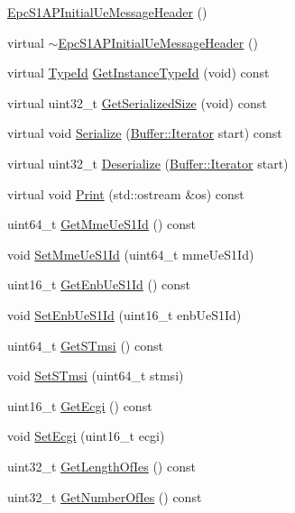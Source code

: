 \begin{DoxyCompactItemize}
\item 
\hyperlink{classns3_1_1EpcS1APInitialUeMessageHeader_a244c755dc91ef9eaf71f06ce5fc20488}{Epc\+S1\+A\+P\+Initial\+Ue\+Message\+Header} ()
\item 
virtual \hyperlink{classns3_1_1EpcS1APInitialUeMessageHeader_a51ef200815802b7791910334de72fe09}{$\sim$\+Epc\+S1\+A\+P\+Initial\+Ue\+Message\+Header} ()
\item 
virtual \hyperlink{classns3_1_1TypeId}{Type\+Id} \hyperlink{classns3_1_1EpcS1APInitialUeMessageHeader_aa44f600a010413f2c0294f8eaf073b9e}{Get\+Instance\+Type\+Id} (void) const 
\item 
virtual uint32\+\_\+t \hyperlink{classns3_1_1EpcS1APInitialUeMessageHeader_a1d8a75614f79dc481dbba20c54079d6b}{Get\+Serialized\+Size} (void) const 
\item 
virtual void \hyperlink{classns3_1_1EpcS1APInitialUeMessageHeader_a3025b6b39964b1ccf6a50fb8ccc308de}{Serialize} (\hyperlink{classns3_1_1Buffer_1_1Iterator}{Buffer\+::\+Iterator} start) const 
\item 
virtual uint32\+\_\+t \hyperlink{classns3_1_1EpcS1APInitialUeMessageHeader_a74d198c4856c95609d20484363e75591}{Deserialize} (\hyperlink{classns3_1_1Buffer_1_1Iterator}{Buffer\+::\+Iterator} start)
\item 
virtual void \hyperlink{classns3_1_1EpcS1APInitialUeMessageHeader_a17dd1cbb77c11db6abc9fcb5e1bcf787}{Print} (std\+::ostream \&os) const 
\item 
uint64\+\_\+t \hyperlink{classns3_1_1EpcS1APInitialUeMessageHeader_a5945bfe1328526ac23087a36c5cfe100}{Get\+Mme\+Ue\+S1\+Id} () const 
\item 
void \hyperlink{classns3_1_1EpcS1APInitialUeMessageHeader_ac2e51e3ced3a394746bb2fc943ca512c}{Set\+Mme\+Ue\+S1\+Id} (uint64\+\_\+t mme\+Ue\+S1\+Id)
\item 
uint16\+\_\+t \hyperlink{classns3_1_1EpcS1APInitialUeMessageHeader_a59a25c80e98c57d14e79c7dc18ad5202}{Get\+Enb\+Ue\+S1\+Id} () const 
\item 
void \hyperlink{classns3_1_1EpcS1APInitialUeMessageHeader_a62deca35d6e6e9ac140f021bf27e307e}{Set\+Enb\+Ue\+S1\+Id} (uint16\+\_\+t enb\+Ue\+S1\+Id)
\item 
uint64\+\_\+t \hyperlink{classns3_1_1EpcS1APInitialUeMessageHeader_a82ec89a18b606765015d88a8df903d23}{Get\+S\+Tmsi} () const 
\item 
void \hyperlink{classns3_1_1EpcS1APInitialUeMessageHeader_aba141b5f39e55d9faa8f612ea9a4a7b6}{Set\+S\+Tmsi} (uint64\+\_\+t stmsi)
\item 
uint16\+\_\+t \hyperlink{classns3_1_1EpcS1APInitialUeMessageHeader_a7d00b85b16b74df317fb84aa28b82a46}{Get\+Ecgi} () const 
\item 
void \hyperlink{classns3_1_1EpcS1APInitialUeMessageHeader_ae338b3a8f604a11b59c299c96eb6167a}{Set\+Ecgi} (uint16\+\_\+t ecgi)
\item 
uint32\+\_\+t \hyperlink{classns3_1_1EpcS1APInitialUeMessageHeader_a09eabcde727e25701f4fb6e6d2ddd7bb}{Get\+Length\+Of\+Ies} () const 
\item 
uint32\+\_\+t \hyperlink{classns3_1_1EpcS1APInitialUeMessageHeader_aa92a805dc0371f7215650557bbb45629}{Get\+Number\+Of\+Ies} () const 
\end{DoxyCompactItemize}
